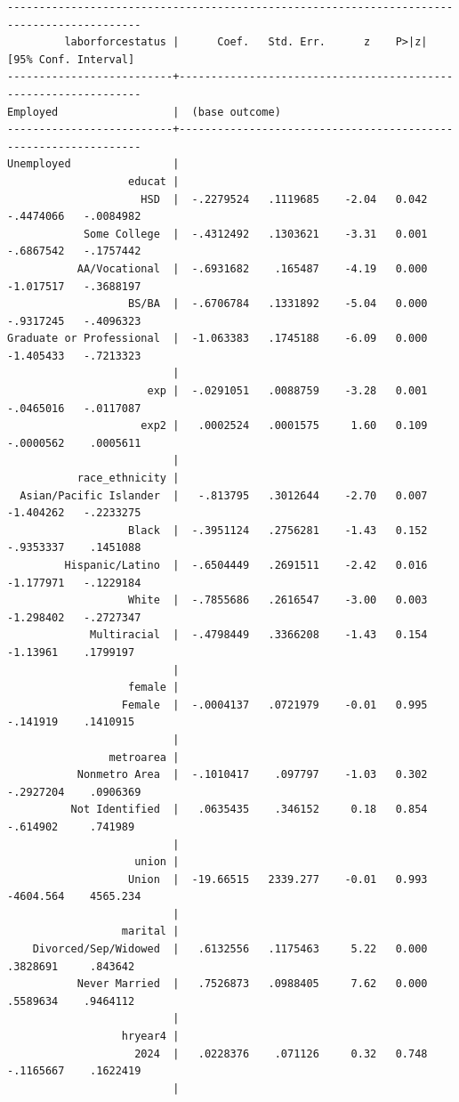 \documentclass[
]{book}
\begin{document}
\begin{verbatim}
-------------------------------------------------------------------------------------------
         laborforcestatus |      Coef.   Std. Err.      z    P>|z|     [95% Conf. Interval]
--------------------------+----------------------------------------------------------------
Employed                  |  (base outcome)
--------------------------+----------------------------------------------------------------
Unemployed                |
                   educat |
                     HSD  |  -.2279524   .1119685    -2.04   0.042    -.4474066   -.0084982
            Some College  |  -.4312492   .1303621    -3.31   0.001    -.6867542   -.1757442
           AA/Vocational  |  -.6931682    .165487    -4.19   0.000    -1.017517   -.3688197
                   BS/BA  |  -.6706784   .1331892    -5.04   0.000    -.9317245   -.4096323
Graduate or Professional  |  -1.063383   .1745188    -6.09   0.000    -1.405433   -.7213323
                          |
                      exp |  -.0291051   .0088759    -3.28   0.001    -.0465016   -.0117087
                     exp2 |   .0002524   .0001575     1.60   0.109    -.0000562    .0005611
                          |
           race_ethnicity |
  Asian/Pacific Islander  |   -.813795   .3012644    -2.70   0.007    -1.404262   -.2233275
                   Black  |  -.3951124   .2756281    -1.43   0.152    -.9353337    .1451088
         Hispanic/Latino  |  -.6504449   .2691511    -2.42   0.016    -1.177971   -.1229184
                   White  |  -.7855686   .2616547    -3.00   0.003    -1.298402   -.2727347
             Multiracial  |  -.4798449   .3366208    -1.43   0.154     -1.13961    .1799197
                          |
                   female |
                  Female  |  -.0004137   .0721979    -0.01   0.995     -.141919    .1410915
                          |
                metroarea |
           Nonmetro Area  |  -.1010417    .097797    -1.03   0.302    -.2927204    .0906369
          Not Identified  |   .0635435    .346152     0.18   0.854     -.614902     .741989
                          |
                    union |
                   Union  |  -19.66515   2339.277    -0.01   0.993    -4604.564    4565.234
                          |
                  marital |
    Divorced/Sep/Widowed  |   .6132556   .1175463     5.22   0.000     .3828691     .843642
           Never Married  |   .7526873   .0988405     7.62   0.000     .5589634    .9464112
                          |
                  hryear4 |
                    2024  |   .0228376    .071126     0.32   0.748    -.1165667    .1622419
                          |

\end{verbatim}
\end{document}
